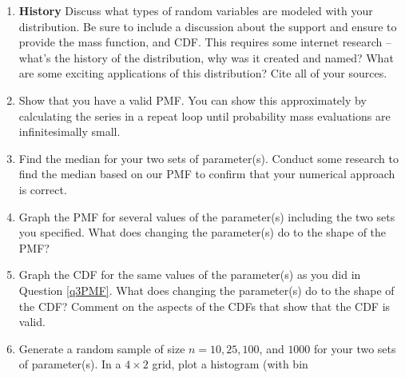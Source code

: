\documentclass{article}\usepackage[]{graphicx}\usepackage[]{color}
\begin{document}
\begin{enumerate}
\begin{enumerate}
  \item \textbf{History} Discuss what types of random variables are modeled with 
  your distribution. Be sure to include a discussion about the support and ensure
  to provide the mass function, and CDF. This requires some internet research -- 
  what's the history of the distribution, why was it created and named? What are
  some exciting applications of this distribution? Cite all of your sources.
	\item Show that you have a valid PMF. You can show this approximately by 
	calculating the series in a repeat loop until probability mass evaluations are 
	infinitesimally small.
	\item Find the median for your two sets of parameter(s). Conduct some research 
	to find the median based on our PMF to confirm that your numerical approach is
	correct. 
	\item \label{q3PMF} Graph the PMF for several values of the parameter(s) 
	including the two sets you specified. What does changing the parameter(s) do 
	to the shape of the PMF?
	 \item Graph the CDF for the same values of the parameter(s) as you did in 
	 Question \ref{q3PMF}. What does changing the parameter(s) do to the shape of 
	 the CDF? Comment on the aspects of the CDFs that show that the CDF is valid.
  \item Generate a random sample of size $n=10, 25, 100$, and $1000$ for your 
  two sets of parameter(s). In a $4 \times 2$ grid, plot a histogram (with bin 

\end{enumerate}
\end{enumerate}
\end{document}
